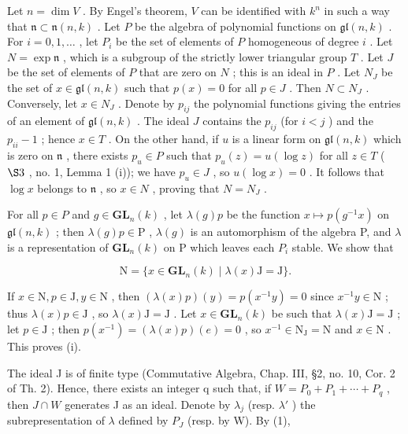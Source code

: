 Let \(n = \dim V\) . By Engel's theorem, \(V\) can be identified with \(k^n\) in such a way that \(\mathfrak{n} \subset \mathfrak{n}(n,k)\) . Let \(P\) be the algebra of polynomial functions on \(\mathfrak{gl}(n,k)\) . For \(i = 0,1,\ldots\) , let \(P_i\) be the set of elements of \(P\) homogeneous of degree \(i\) . Let \(N = \exp \mathfrak{n}\) , which is a subgroup of the strictly lower triangular group \(T\) . Let \(J\) be the set of elements of \(P\) that are zero on \(N\) ; this is an ideal in \(P\) . Let \(N_J\) be the set of \(x \in \mathfrak{gl}(n,k)\) such that \(p(x) = 0\) for all \(p \in J\) . Then \(N \subset N_J\) . Conversely, let \(x \in N_J\) . Denote by \(p_{ij}\) the polynomial functions giving the entries of an element of \(\mathfrak{gl}(n,k)\) . The ideal \(J\) contains the \(p_{ij}\) (for \(i < j\) ) and the \(p_{ii} - 1\) ; hence \(x \in T\) . On the other hand, if \(u\) is a linear form on \(\mathfrak{gl}(n,k)\) which is zero on \(\mathfrak{n}\) , there exists \(p_u \in P\) such that \(p_u(z) = u(\log z)\) for all \(z \in T\) ( \(\S 3\) , no. 1, Lemma 1 (i)); we have \(p_u \in J\) , so \(u(\log x) = 0\) . It follows that \(\log x\) belongs to \(\mathfrak{n}\) , so \(x \in N\) , proving that \(N = N_J\) .

For all \(p \in P\) and \(g \in \mathbf{GL}_{n}(k)\) , let \(\lambda(g)p\) be the function \(x \mapsto p(g^{-1}x)\) on \(\mathfrak{gl}(n,k)\) ; then \(\lambda(g)p \in \mathrm{P}\) , \(\lambda(g)\) is an automorphism of the algebra P, and \(\lambda\) is a representation of \(\mathbf{GL}_{n}(k)\) on P which leaves each \(P_{i}\) stable. We show that

\[
\mathrm{N} = \{x \in \mathbf {G L} _ {n} (k) \mid \lambda (x) \mathrm{J} = \mathrm{J} \}.\tag{1}
\]

If \(x \in \mathrm{N}, p \in \mathrm{J}, y \in \mathrm{N}\) , then \((\lambda(x)p)(y) = p(x^{-1}y) = 0\) since \(x^{-1}y \in \mathrm{N}\) ; thus \(\lambda(x)p \in \mathrm{J}\) , so \(\lambda(x)\mathrm{J} = \mathrm{J}\) . Let \(x \in \mathbf{GL}_n(k)\) be such that \(\lambda(x)\mathrm{J} = \mathrm{J}\) ; let \(p \in \mathrm{J}\) ; then \(p(x^{-1}) = (\lambda(x)p)(e) = 0\) , so \(x^{-1} \in \mathrm{N}_{\mathrm{J}} = \mathrm{N}\) and \(x \in \mathrm{N}\) . This proves (i).

The ideal J is of finite type (Commutative Algebra, Chap. III, §2, no. 10, Cor. 2 of Th. 2). Hence, there exists an integer q such that, if \(W = P_{0} + P_{1} + \cdots + P_{q}\) , then \(J \cap W\) generates J as an ideal. Denote by \(\lambda_{j}\) (resp. \(\lambda'\) ) the subrepresentation of \(\lambda\) defined by \(P_{J}\) (resp. by W). By (1),


